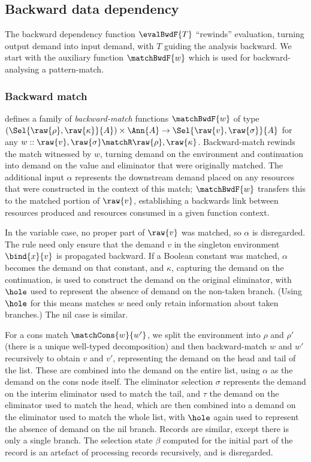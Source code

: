 \subsection{Backward data dependency}
\label{sec:data-dependencies:analyses:bwd}

The backward dependency function $\evalBwdF{T}$ ``rewinds'' evaluation, turning output demand into input demand, with $T$ guiding the analysis backward. We start with the auxiliary function $\matchBwdF{w}$ which is used for backward-analysing a pattern-match.

\subsubsection{Backward match}
\label{sec:data-dependencies:analyses:bwd:pattern-match}

 defines a family of \emph{backward-match} functions $\matchBwdF{w}$ of type $(\Sel{\raw{\rho}, \raw{\kappa}}{A}) \times \Ann{A} \to \Sel{\raw{v}, \raw{\sigma}}{A}$ for any $w :: \raw{v}, \raw{\sigma} \matchR \raw{\rho}, \raw{\kappa}$. Backward-match rewinds the match witnessed by $w$, turning demand on the environment and continuation into demand on the value and eliminator that were originally matched. The additional input $\alpha$ represents the downstream demand placed on any resources that were constructed in the context of this match; $\matchBwdF{w}$ transfers this to the matched portion of $\raw{v}$, establishing a backwards link between resources produced and resources consumed in a given function context.



In the variable case, no proper part of $\raw{v}$ was matched, so $\alpha$ is disregarded. The rule need only ensure that the demand $v$ in the singleton environment $\bind{x}{v}$ is propagated backward. If a Boolean constant was matched, $\alpha$ becomes the demand on that constant, and $\kappa$, capturing the demand on the continuation, is used to construct the demand on the original eliminator, with $\hole$ used to represent the absence of demand on the non-taken branch. (Using $\hole$ for this means matches $w$ need only retain information about taken branches.) The nil case is similar.

For a cons match $\matchCons{w}{w'}$, we split the environment into $\rho$ and $\rho'$ (there is a unique well-typed decomposition) and then backward-match $w$ and $w'$ recursively to obtain $v$ and $v'$, representing the demand on the head and tail of the list. These are combined into the demand on the entire list, using $\alpha$ as the demand on the cons node itself. The eliminator selection $\sigma$ represents the demand on the interim eliminator used to match the tail, and $\tau$ the demand on the eliminator used to match the head, which are then combined into a demand on the eliminator used to match the whole list, with $\hole$ again used to represent the absence of demand on the nil branch. Records are similar, except there is only a single branch. The selection state $\beta$ computed for the initial part of the record is an artefact of processing records recursively, and is disregarded.

